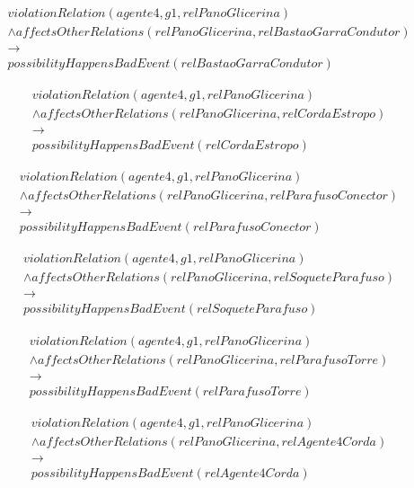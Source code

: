 \begin{eqnarray}\nonumber
	violationRelation(agente4,g1,relPanoGlicerina)  \nonumber \\ 
	\wedge affectsOtherRelations(relPanoGlicerina,relBastaoGarraCondutor)   \nonumber \\ 
	\to \nonumber \\  
	possibilityHappensBadEvent(relBastaoGarraCondutor) 
\end{eqnarray}

\begin{eqnarray}\nonumber
	violationRelation(agente4,g1,relPanoGlicerina)  \nonumber \\ 
	\wedge affectsOtherRelations(relPanoGlicerina,relCordaEstropo)   \nonumber \\ 
	\to \nonumber \\  
	possibilityHappensBadEvent(relCordaEstropo) 
\end{eqnarray}

\begin{eqnarray}\nonumber
	violationRelation(agente4,g1,relPanoGlicerina)  \nonumber \\ 
	\wedge affectsOtherRelations(relPanoGlicerina,relParafusoConector)   \nonumber \\ 
	\to \nonumber \\  
	possibilityHappensBadEvent(relParafusoConector) 
\end{eqnarray}

\begin{eqnarray}\nonumber
	violationRelation(agente4,g1,relPanoGlicerina)  \nonumber \\ 
	\wedge affectsOtherRelations(relPanoGlicerina,relSoqueteParafuso)   \nonumber \\ 
	\to \nonumber \\  
	possibilityHappensBadEvent(relSoqueteParafuso) 
\end{eqnarray}

\begin{eqnarray}\nonumber
	violationRelation(agente4,g1,relPanoGlicerina)  \nonumber \\ 
	\wedge affectsOtherRelations(relPanoGlicerina,relParafusoTorre)   \nonumber \\ 
	\to \nonumber \\  
	possibilityHappensBadEvent(relParafusoTorre) 
\end{eqnarray}

\begin{eqnarray}\nonumber
	violationRelation(agente4,g1,relPanoGlicerina)  \nonumber \\ 
	\wedge affectsOtherRelations(relPanoGlicerina,relAgente4Corda)   \nonumber \\ 
	\to \nonumber \\  
	possibilityHappensBadEvent(relAgente4Corda) 
\end{eqnarray}

